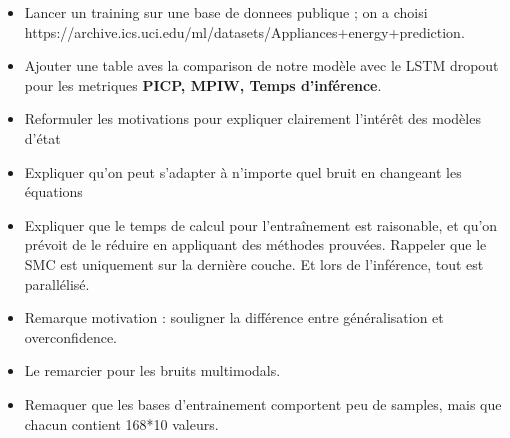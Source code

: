 \documentclass{article}
\begin{document}
\begin{itemize}
	\item Lancer un training sur une base de donnees publique ; on a choisi https://archive.ics.uci.edu/ml/datasets/Appliances+energy+prediction.
	\item Ajouter une table aves la comparison de notre modèle avec le LSTM dropout pour les metriques \textbf{PICP, MPIW, Temps d'inférence}.
	\item Reformuler les motivations pour expliquer clairement l'intérêt des modèles d'état
	\item Expliquer qu'on peut s'adapter à n'importe quel bruit en changeant les équations
	\item Expliquer que le temps de calcul pour l'entraînement est raisonable, et qu'on prévoit de le réduire en appliquant des méthodes prouvées. Rappeler que le SMC est uniquement sur la dernière couche. Et lors de l'inférence, tout est parallélisé.
	\item Remarque motivation : souligner la différence entre généralisation et overconfidence.
	\item Le remarcier pour les bruits multimodals.
	\item Remaquer que les bases d'entrainement comportent peu de samples, mais que chacun contient 168*10 valeurs.
\end{itemize}



\end{document}
